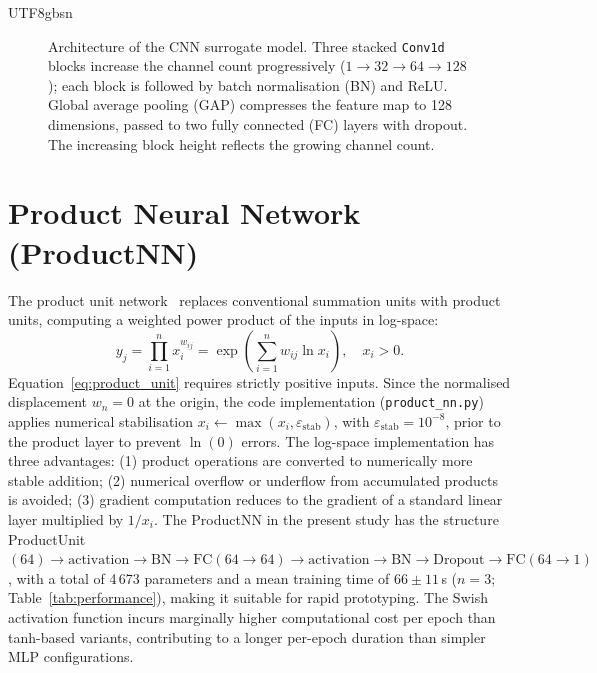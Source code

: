 \documentclass[a4paper,12pt]{report}
\begin{document}
\begin{CJK}{UTF8}{gbsn}
\begin{figure}[H]
\caption{Architecture of the CNN surrogate model. Three stacked \texttt{Conv1d} blocks
increase the channel count progressively ($1\!\to\!32\!\to\!64\!\to\!128$); each block
is followed by batch normalisation (BN) and ReLU. Global average pooling (GAP) compresses
the feature map to 128 dimensions, passed to two fully connected (FC) layers with dropout.
The increasing block height reflects the growing channel count.}
\label{fig:cnn}
\end{figure}

\section{Product Neural Network (ProductNN)}
\label{sec:productnn}

The product unit network~\cite{durbin1989} replaces conventional summation units with
product units, computing a weighted power product of the inputs in log-space:
\begin{equation}
  y_j = \prod_{i=1}^{n} x_i^{w_{ij}} = \exp\!\left(\sum_{i=1}^{n} w_{ij} \ln x_i\right),
  \quad x_i > 0.
  \label{eq:product_unit}
\end{equation}
Equation~\eqref{eq:product_unit} requires strictly positive inputs. Since the normalised
displacement $w_n = 0$ at the origin, the code implementation (\texttt{product\_nn.py})
applies numerical stabilisation $x_i \leftarrow \max(x_i, \varepsilon_{\text{stab}})$,
with $\varepsilon_{\text{stab}} = 10^{-8}$, prior to the product layer to prevent
$\ln(0)$ errors. The log-space implementation has three advantages: (1) product
operations are converted to numerically more stable addition; (2) numerical overflow or
underflow from accumulated products is avoided; (3) gradient computation reduces to the
gradient of a standard linear layer multiplied by $1/x_i$. The ProductNN in the present
study has the structure ProductUnit$(64) \to \text{activation} \to \text{BN} \to
\text{FC}(64 \to 64) \to \text{activation} \to \text{BN} \to \text{Dropout} \to
\text{FC}(64 \to 1)$, with a total of 4\,673 parameters and a mean training time of $66 \pm 11$\,s
($n = 3$; Table~\ref{tab:performance}), making it suitable for rapid prototyping.
The Swish activation function incurs marginally higher computational cost per epoch than
tanh-based variants, contributing to a longer per-epoch duration than simpler MLP
configurations.


\end{CJK}
\end{document}

